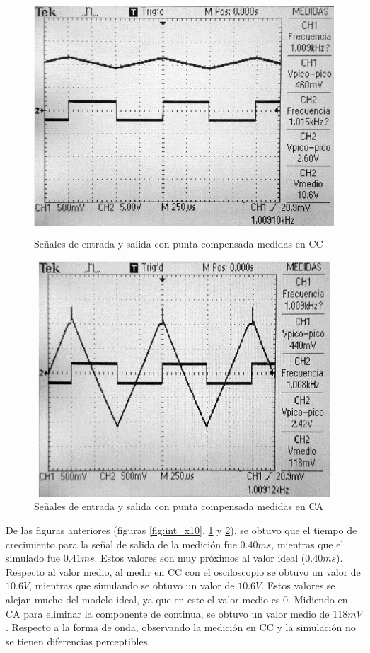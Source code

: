 \documentclass[10pt,spanish,a4paper,openany,notitlepage]{article}
\begin{document}
\begin{figure}[H]
\centering
\includegraphics[width=350pt, height=250pt]{mediciones/B-X10-CC.jpg}
\caption{Señales de entrada y salida con punta compensada medidas en CC}
\label{fig:int_medCC_x10}
\end{figure}

\begin{figure}[H]
\centering
\includegraphics[width=350pt, height=250pt]{mediciones/B-X10-CA.jpg}
\caption{Señales de entrada y salida con punta compensada medidas en CA}
\label{fig:int_medCA_x10}
\end{figure}

De las figuras anteriores (figuras \ref{fig:int_x10}, \ref{fig:int_medCC_x10} y \ref{fig:int_medCA_x10}), se obtuvo que el tiempo de crecimiento para la señal de salida de la medición fue $0.40 \unit{ms}$, mientras que el simulado fue $0.41 \unit{ms}$. Estos valores son muy próximos al valor ideal ($0.40 \unit{ms}$). Respecto al valor medio, al medir en CC con el osciloscopio se obtuvo un valor de $10.6 \unit{V}$, mientras que simulando se obtuvo un valor de $10.6 \unit{V}$. Estos valores se alejan mucho del modelo ideal, ya que en este el valor medio es 0. Midiendo en CA para eliminar la componente de continua, se obtuvo un valor medio de $118 \unit{mV}$. Respecto a la forma de onda, observando la medición en CC y la simulación no se tienen diferencias perceptibles.
\end{document}
